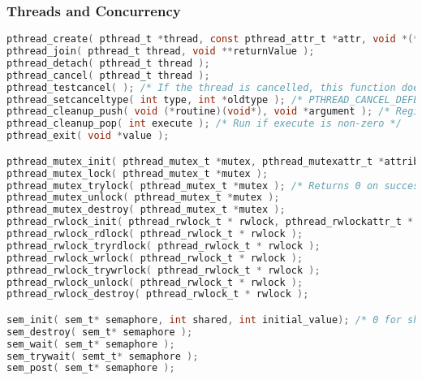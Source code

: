 \documentclass[legalpaper,10pt]{article}
\begin{document}
\subsubsection*{Threads and Concurrency}

\begin{lstlisting}[language=C]
pthread_create( pthread_t *thread, const pthread_attr_t *attr, void *(*start_routine)( void * ), void *arg );
pthread_join( pthread_t thread, void **returnValue );
pthread_detach( pthread_t thread );
pthread_cancel( pthread_t thread );
pthread_testcancel( ); /* If the thread is cancelled, this function does not return (thread terminated) */
pthread_setcanceltype( int type, int *oldtype ); /* PTHREAD_CANCEL_DEFERRED or PTHREAD_CANCEL_ASYNCHRONOUS */
pthread_cleanup_push( void (*routine)(void*), void *argument ); /* Register cleanup handler, with argument */ 
pthread_cleanup_pop( int execute ); /* Run if execute is non-zero */
pthread_exit( void *value );

pthread_mutex_init( pthread_mutex_t *mutex, pthread_mutexattr_t *attributes );
pthread_mutex_lock( pthread_mutex_t *mutex );
pthread_mutex_trylock( pthread_mutex_t *mutex ); /* Returns 0 on success */
pthread_mutex_unlock( pthread_mutex_t *mutex );
pthread_mutex_destroy( pthread_mutex_t *mutex );
pthread_rwlock_init( pthread_rwlock_t * rwlock, pthread_rwlockattr_t * attr );
pthread_rwlock_rdlock( pthread_rwlock_t * rwlock );
pthread_rwlock_tryrdlock( pthread_rwlock_t * rwlock );
pthread_rwlock_wrlock( pthread_rwlock_t * rwlock );
pthread_rwlock_trywrlock( pthread_rwlock_t * rwlock );
pthread_rwlock_unlock( pthread_rwlock_t * rwlock );
pthread_rwlock_destroy( pthread_rwlock_t * rwlock );

sem_init( sem_t* semaphore, int shared, int initial_value); /* 0 for shared OK */
sem_destroy( sem_t* semaphore );
sem_wait( sem_t* semaphore );
sem_trywait( semt_t* semaphore );
sem_post( sem_t* semaphore );
\end{lstlisting}
\end{document}
